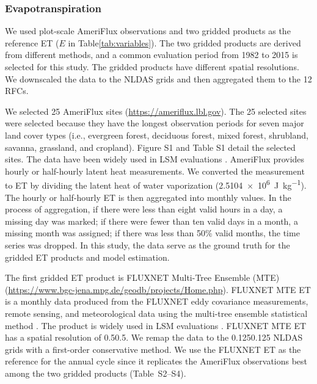 \documentclass[essd, manuscript]{copernicus}
\begin{document}
\subsubsection{Evapotranspiration}\label{sec:methods:ref:et}

We used plot-scale AmeriFlux observations and two gridded products as the reference ET (\(E\) in Table\ref{tab:variables}). The two gridded products are derived from different methods, and a common evaluation period from 1982 to 2015 is selected for this study. The gridded products have different spatial resolutions. We downscaled the data to the NLDAS grids and then aggregated them to the 12 RFCs.

We selected 25 AmeriFlux sites (\url{https://ameriflux.lbl.gov}). The 25 selected sites were selected because they have the longest observation periods for seven major land cover types (i.e., evergreen forest, deciduous forest, mixed forest, shrubland, savanna, grassland, and cropland). Figure S1 and Table S1 detail the selected sites. The data have been widely used in LSM evaluations \citep{cai2014JGRA, zhang2020AFM}. AmeriFlux provides hourly or half-hourly latent heat measurements. We converted the measurement to ET by dividing the latent heat of water vaporization (\qty{2.5104e6}{J.kg^{-1}}). The hourly or half-hourly ET is then aggregated into monthly values. In the process of aggregation, if there were less than eight valid hours in a day, a missing day was marked; if there were fewer than ten valid days in a month, a missing month was assigned; if there was less than 50\% valid months, the time series was dropped. In this study, the data serve as the ground truth for the gridded ET products and model estimation.

The first gridded ET product is FLUXNET Multi-Tree Ensemble (MTE) \citep{jung2009B} (\url{https://www.bgc-jena.mpg.de/geodb/projects/Home.php}). FLUXNET MTE ET is a monthly data produced from the FLUXNET eddy covariance measurements, remote sensing, and meteorological data using the multi-tree ensemble statistical method \citep{jung2009B}. The product is widely used in LSM evaluations \citep{cai2014JGRA, ma2017JGRA, xia2016JGRA, jung2019SD, fang2020AFM, zhang2020AFM, pan2020HESS}. FLUXNET MTE ET has a spatial resolution of 0.5\degree{}\times{}0.5\degree{}. We remap the data to the 0.125\degree{}\times{}0.125\degree{} NLDAS grids with a first-order conservative method. We use the FLUXNET ET as the reference for the annual cycle since it replicates the AmeriFlux observations best among the two gridded products (Table~S2--S4).
\end{document}
